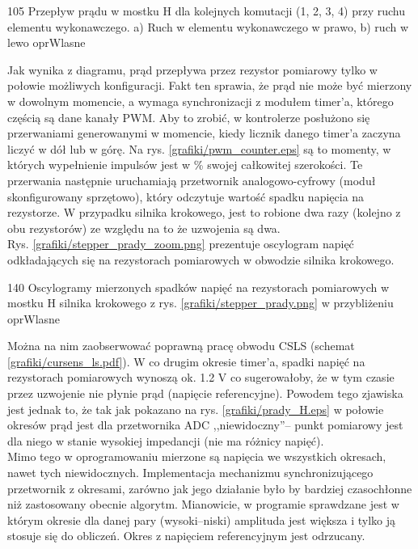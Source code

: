 	{105}
	{Przepływ prądu w mostku H dla kolejnych komutacji (1, 2, 3, 4) przy ruchu elementu wykonawczego. a) Ruch w elementu wykonawczego w prawo, b) ruch w lewo}
	{oprWlasne}

Jak wynika z diagramu, prąd przepływa przez rezystor pomiarowy tylko w połowie możliwych konfiguracji. Fakt ten sprawia, że prąd nie może być mierzony \linebreak w dowolnym momencie, a wymaga synchronizacji z modułem timer'a, którego częścią są dane kanały PWM. Aby to zrobić, w kontrolerze posłużono się przerwaniami generowanymi w momencie, kiedy licznik danego timer'a zaczyna liczyć w dół lub w górę. Na rys. \ref{grafiki/pwm_counter.eps} są to momenty, w których wypełnienie impulsów jest w \% swojej całkowitej szerokości. Te przerwania następnie uruchamiają przetwornik analogowo-cyfrowy (moduł skonfigurowany sprzętowo), który odczytuje wartość spadku napięcia na rezystorze. W przypadku silnika krokowego, jest to robione dwa razy (kolejno z obu rezystorów) ze względu na to że uzwojenia są dwa. \\

Rys. \ref{grafiki/stepper_prady_zoom.png} prezentuje oscylogram napięć odkładających się na rezystorach pomiarowych w obwodzie silnika krokowego. 

	{140}
	{Oscylogramy mierzonych spadków napięć na rezystorach pomiarowych w mostku H silnika krokowego z rys. \ref{grafiki/stepper_prady.png} w przybliżeniu}
	{oprWlasne}
	
Można na nim zaobserwować poprawną pracę obwodu CSLS (schemat \ref{grafiki/cursens_ls.pdf}). \linebreak W co drugim okresie timer'a, spadki napięć na rezystorach pomiarowych wynoszą ok. 1.2 V co sugerowałoby, że w tym czasie przez uzwojenie nie płynie prąd (napięcie referencyjne). Powodem tego zjawiska jest jednak to, że tak jak pokazano na rys. \ref{grafiki/prady_H.eps} w połowie okresów prąd jest dla przetwornika ADC ,,niewidoczny''-- punkt pomiarowy jest dla niego w stanie wysokiej impedancji (nie ma różnicy napięć). \\

Mimo tego w oprogramowaniu mierzone są napięcia we wszystkich okresach, nawet tych niewidocznych. Implementacja mechanizmu synchronizującego przetwornik z okresami, zarówno jak jego działanie było by bardziej czasochłonne niż zastosowany obecnie algorytm. Mianowicie, w programie sprawdzane jest w którym okresie dla danej pary (wysoki--niski) amplituda jest większa i tylko ją stosuje się do obliczeń. Okres z napięciem referencyjnym jest odrzucany. \\

